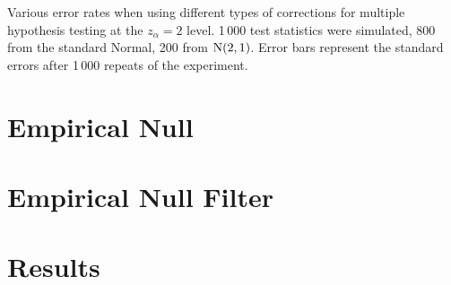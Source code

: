 \begin{table}
    \centering
    
    \caption{Various error rates when using different types of corrections for multiple hypothesis testing at the $z_\alpha=2$ level. 1\,000 test statistics were simulated, 800 from the standard Normal, 200 from $\operatorname{N}(2,1)$. Error bars represent the standard errors after 1\,000 repeats of the experiment.}
\end{table}

\section{Empirical Null}

\section{Empirical Null Filter}

\section{Results}